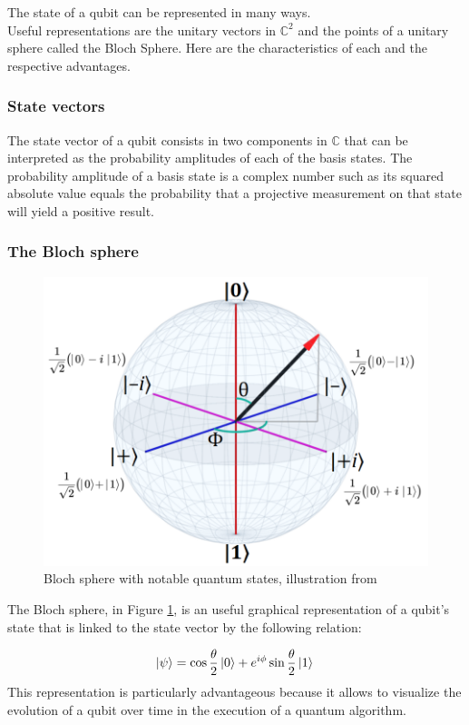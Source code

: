 \documentclass{article}
\begin{document}
The state of a qubit can be represented in many ways.\\
Useful representations are the unitary vectors in $\mathbb{C}^2$
and the points of a unitary sphere called the Bloch Sphere.
Here are the characteristics of each and the respective advantages.

\subsubsection{State vectors}

The state vector of a qubit consists in two components in $\mathbb{C}$
that can be interpreted as the probability amplitudes of each of the
basis states.
The probability amplitude of a basis state is a complex number such
as its squared absolute value equals the probability that a
projective measurement on that state will yield a positive result.


\subsubsection{The Bloch sphere}

\begin{figure}
	\centering

	\includegraphics[scale=0.5]{bloch-sphere.png}
	\caption{Bloch sphere with notable quantum states, illustration from \cite{wyrd2021bloch}}
	\label{blsphere}
\end{figure}
The Bloch sphere, in Figure \ref{blsphere},
is an useful graphical representation of a qubit's state
that is linked to the state vector by the following relation:

\begin{equation}
	\ket{\psi} = \cos{\dfrac{\theta}{2}}\ket{0}+e^{i\phi}\sin{\dfrac{\theta}{2}}\ket{1} \\
\end{equation}
This representation is particularly advantageous because it allows
to visualize the evolution of a qubit over time in the execution
of a quantum algorithm.
\end{document}
